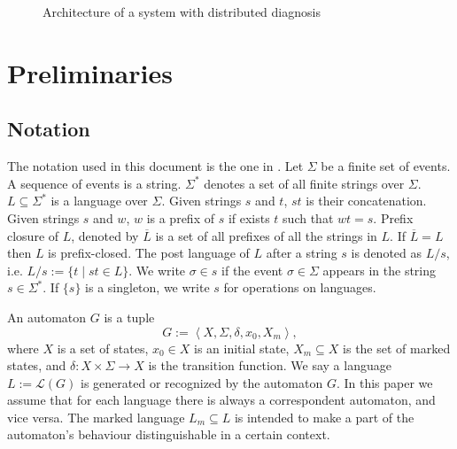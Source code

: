 \documentclass[letterpaper, 10pt, conference]{ieeeconf}
\begin{document}
\begin{figure}[t]
\centering
{}
\caption{Architecture of a system with distributed diagnosis}
\label{fig_distributed}
\end{figure}


\section{Preliminaries}
\label{sec:Preliminaries}

\subsection{Notation}
The notation used in this document is the one in
\cite{cassandras_introduction_2010}.
Let $\Sigma$ be a finite set of events. A sequence of events is a string.
$\Sigma^*$ denotes a set of all finite strings over $\Sigma$.
$L\subseteq\Sigma^*$ is a language over $\Sigma$. Given strings $s$ and $t$,
$st$ is their concatenation. Given strings $s$ and $w$, $w$ is a prefix of $s$
if exists $t$ such that $wt = s$. Prefix closure of $L$, denoted by
$\overline{L}$ is a set of all prefixes of all the strings in $L$.
If $\overline{L} = L$ then $L$ is prefix-closed. The post language of $L$ after
a string $s$ is denoted as $L/s$, i.e. $L/s := \{t\mid st \in L\}$. We
write $\sigma \in s$ if the event $\sigma \in \Sigma$ appears in the string $s
\in \Sigma^*$. If $\{s\}$ is a singleton, we write $s$ for operations on
languages.

An automaton $G$ is a tuple $$G := \left< X,\Sigma,\delta,x_0, X_m \right>,$$
where $X$ is a set of states, $x_0 \in X$ is an initial state, $X_m \subseteq X$ is the set of
marked states, and $\delta: X \times \Sigma \rightarrow X$ is the transition
function.
We say a language $L := \mathcal{L}(G)$ is generated or recognized by the
automaton $G$. In this paper we assume that for each language there is always a
correspondent automaton, and vice versa. The marked language $L_m \subseteq L$
is intended to make a part of the automaton's behaviour distinguishable in a
certain context.
\end{document}
